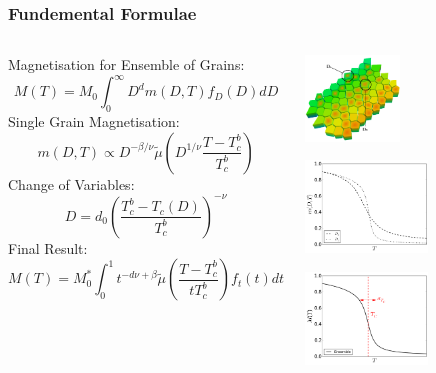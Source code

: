\documentclass{beamer}
\begin{document}
\begin{frame}
	\frametitle{Fundemental Formulae}
	\begin{columns}
	\column{8cm}
	\small{
	\newline
	Magnetisation for Ensemble of Grains:
	$$
	M(T) = M_0\int_0^\infty D^{d} m(D,T) f_D(D) dD
	$$
	Single Grain Magnetisation:
	$$
	m(D,T) \propto D^{-\beta/\nu} \tilde{\mu} \left(D^{1/\nu}\frac{T-T_c^b}{T_c^b}\right)
	$$
	Change of Variables:
	$$
	D = d_0\left(\frac{T_c^b - T_c(D)}{T_c^b}\right)^{-\nu}
	$$
	Final Result:
	$$
	M(T) = M_0^*\int_0^1 t^{-d\nu +\beta} \tilde{\mu}\left(\frac{T-T_c^b}{tT_c^b}\right) f_t(t) dt
	$$}
	\column{4cm}
	\begin{center}
	\includegraphics[width=2.5cm]{Images/grains2}

	\includegraphics[width=3.25cm]{Images/Ds_noinset}

	\includegraphics[width=3.25cm]{Images/Aggregate}
	\end{center}
	\end{columns}
\end{frame}
\end{document}
